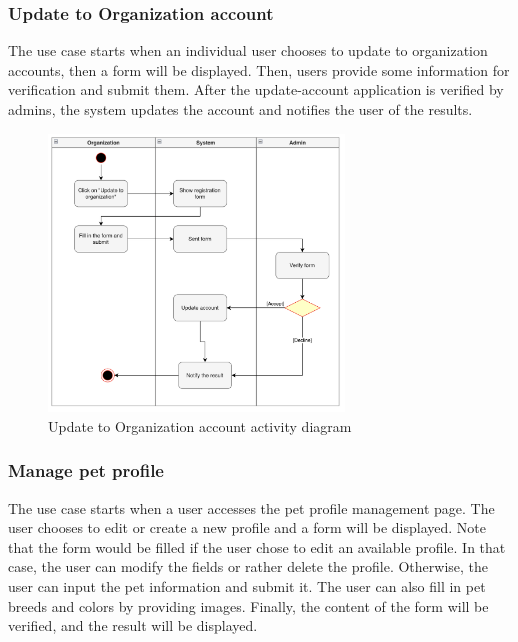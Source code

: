 \subsubsection{Update to Organization account}

The use case starts when an individual user chooses to update to organization accounts, then a form will be displayed. Then, users provide some information for verification and submit them. After the update-account application is verified by admins, the system updates the account and notifies the user of the results.

\begin{figure}[H]
  \centering
  \includegraphics[width=0.7\textwidth]{Figures/update_org.png}
  \caption{Update to Organization account activity diagram}
  \label{fig:update-org}
\end{figure}

\subsubsection{Manage pet profile}

The use case starts when a user accesses the pet profile management page. The user chooses to edit or create a new profile and a form will be displayed. Note that the form would be filled if the user chose to edit an available profile. In that case, the user can modify the fields or rather delete the profile. Otherwise, the user can input the pet information and submit it. The user can also fill in pet breeds and colors by providing images. Finally, the content of the form will be verified, and the result will be displayed.

